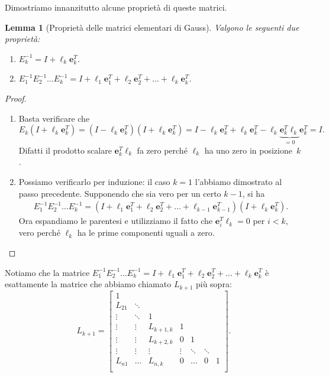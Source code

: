 \documentclass[a4paper]{report}
\newtheorem{lemma}[theorem]{Lemma}
\theoremstyle{definition}
\theoremstyle{remark}
\begin{document}
Dimostriamo innanzitutto alcune proprietà di queste matrici.
\begin{lemma}[Proprietà delle matrici elementari di Gauss] Valgono le seguenti due proprietà:
\begin{enumerate}
    \item $E_k^{-1} = I + \boldsymbol{\ell}_k \mathbf{e}_k^T$.
    \item $E_1^{-1}E_2^{-1}\dots E_k^{-1} = I + \boldsymbol{\ell}_1 \mathbf{e}_1^T + \boldsymbol{\ell}_2 \mathbf{e}_2^T + \dots + \boldsymbol{\ell}_k \mathbf{e}_k^T$.
\end{enumerate}
\end{lemma}
\begin{proof}
\begin{enumerate}
    \item Basta verificare che
    \[
    E_k(I+\boldsymbol{\ell}_k \mathbf{e}_k^T) = (I-\boldsymbol{\ell}_k\mathbf{e}_k^T)(I+\boldsymbol{\ell}_k \mathbf{e}_k^T) = I - \boldsymbol{\ell}_k \mathbf{e}_k^T + \boldsymbol{\ell}_k \mathbf{e}_k^T - \boldsymbol{\ell}_k\underbrace{\mathbf{e}_k^T\boldsymbol{\ell}_k}_{=0}\mathbf{e}_k^T = I.
    \]
    Difatti il prodotto scalare $\mathbf{e}_k^T\boldsymbol{\ell}_k$ fa zero perché $\boldsymbol{\ell}_k$ ha uno zero in posizione~$k$.
    \item Possiamo verificarlo per induzione: il caso $k=1$ l'abbiamo dimostrato al passo precedente. Supponendo che sia vero per un certo $k-1$, si ha
    \begin{align*}
    E_1^{-1}E_2^{-1}\dots E_k^{-1} = (I + \boldsymbol{\ell}_1 \mathbf{e}_1^T + \boldsymbol{\ell}_2 \mathbf{e}_2^T + \dots + \boldsymbol{\ell}_{k-1} \mathbf{e}_{k-1}^T)(I+\ell_k \mathbf{e}_k^T).
    \end{align*}
    Ora espandiamo le parentesi e utilizziamo il fatto che $\mathbf{e}_i^T\boldsymbol{\ell}_k=0$ per $i<k$, vero perché $\boldsymbol{\ell}_k$ ha le prime componenti uguali a zero.
\end{enumerate}
\end{proof}
Notiamo che la matrice $E_1^{-1}E_2^{-1}\dots E_k^{-1} = I + \boldsymbol{\ell}_1 \mathbf{e}_1^T + \boldsymbol{\ell}_2 \mathbf{e}_2^T + \dots + \boldsymbol{\ell}_k \mathbf{e}_k^T$ è esattamente la matrice che abbiamo chiamato $L_{k+1}$ più sopra:
\[
    L_{k+1} = \begin{bmatrix}
        1\\
        L_{21} & \ddots\\
        \vdots & \ddots & 1\\
        \vdots & \vdots & L_{k+1,k} & 1\\
        \vdots & \vdots & L_{k+2,k} & 0 & 1\\
        \vdots & \vdots & \vdots & \vdots & \ddots & \ddots\\
        L_{n1} & \dots & L_{n,k} & 0 & \dots & 0 & 1\\
    \end{bmatrix}.
\]
\end{document}
